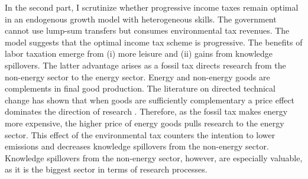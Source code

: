 In the second part, I scrutinize whether progressive income taxes remain optimal in an endogenous growth model with heterogeneous skills. The government cannot use lump-sum transfers but consumes environmental tax revenues.
 The model suggests that the optimal income tax scheme is progressive. The benefits of labor taxation emerge from (i) more leisure and (ii) gains from knowledge spillovers.
 The latter advantage arises as a fossil tax directs research from the non-energy sector to the energy sector.  Energy and non-energy goods are complements in final good production. The literature on directed technical change has shown that when goods are sufficiently complementary a price effect dominates the direction of research \citep{Acemoglu2002DirectedChange, Acemoglu2012TheChange, Hemous2021DirectedEconomics}. Therefore, as the fossil tax makes energy more expensive, the higher price of energy goods pulls research to the energy sector.
 This effect of the environmental tax counters the intention to lower emissions and decreases knowledge spillovers from the non-energy sector. Knowledge spillovers from the non-energy sector, however, are especially valuable, as it is the biggest sector in terms of research processes. 

% 
 
 

